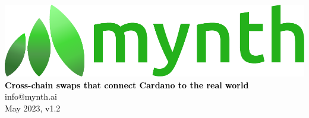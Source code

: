 \documentclass{article}
\begin{document}
\begin{sloppypar}

\begin{titlepage}
\sffamily\selectfont
\centering
\vspace*{7cm}
{\includegraphics[width=15cm]{
mynth-logo.pdf}}\\[5\baselineskip]
\textcolor{black}{
{\Large \textbf{Cross-chain swaps that connect Cardano to the real world}}\\[2\baselineskip]
{\large info@mynth.ai}\\[3\baselineskip]
{\large May 2023, v1.2}
}
\end{titlepage}

\tableofcontents



\end{sloppypar}
\end{document}
